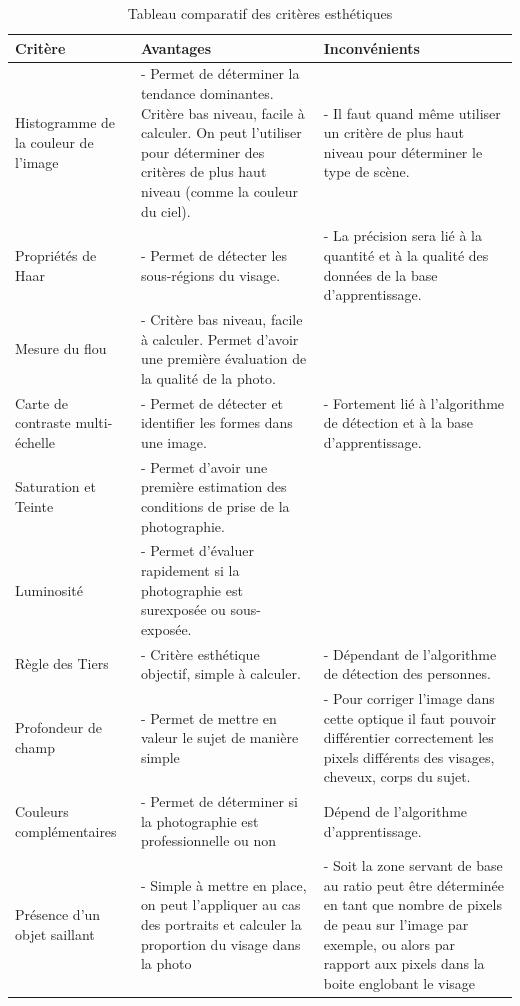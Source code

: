 \documentclass[11pt, french]{report-rd-info}
\begin{document}
\begin{table}
\begin{center}
\begin{tabular}{|p{3cm}|p{7cm}|p{7cm}|}
\hline
\textbf{Critère} & \textbf{Avantages} & \textbf{Inconvénients} \\ \hline
Histogramme de la couleur de l'image & - Permet de déterminer la tendance dominantes. Critère bas niveau, facile à calculer. On peut l'utiliser pour déterminer des critères de plus haut niveau (comme la couleur du ciel). & - Il faut quand même utiliser un critère de plus haut niveau pour déterminer le type de scène. \\ \hline
Propriétés de Haar & - Permet de détecter les sous-régions du visage. & - La précision sera lié à la quantité et à la qualité des données de la base d'apprentissage. \\ \hline
Mesure du flou & - Critère bas niveau, facile à calculer. Permet d'avoir une première évaluation de la qualité de la photo. &  \\ \hline
Carte de contraste multi-échelle & - Permet de détecter et identifier les formes dans une image. & - Fortement lié à l’algorithme de détection et à la base d'apprentissage. \\ \hline
Saturation et Teinte & - Permet d'avoir une première estimation des conditions de prise de la photographie. &  \\ \hline
Luminosité & - Permet d'évaluer rapidement si la photographie est surexposée ou sous-exposée. &  \\ \hline
Règle des Tiers & - Critère esthétique objectif, simple à calculer. & - Dépendant de l'algorithme de détection des personnes. \\ \hline
Profondeur de champ & - Permet de mettre en valeur le sujet de manière simple & - Pour corriger l'image dans cette optique il faut pouvoir différentier correctement les pixels différents des visages, cheveux, corps du sujet. \\ \hline
Couleurs complémentaires & - Permet de déterminer si la photographie est professionnelle ou non & Dépend de l’algorithme d'apprentissage. \\ \hline
Présence d'un objet saillant & - Simple à mettre en place, on peut l'appliquer au cas des portraits et calculer la proportion du visage dans la photo & - Soit la zone servant de base au ratio peut être déterminée en tant que nombre de pixels de peau sur l'image par exemple, ou alors par rapport aux pixels dans la boite englobant le visage \\ \hline
\end{tabular}
\end{center}
\caption{Tableau comparatif des critères esthétiques}
\label{tab:ComparaisonCriteres}
\end{table}
\end{document}
